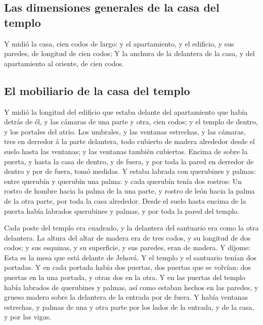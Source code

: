 \hypertarget{las-dimensiones-generales-de-la-casa-del-templo}{%
\subsection{Las dimensiones generales de la casa del
templo}\label{las-dimensiones-generales-de-la-casa-del-templo}}

 Y midió la casa, cien codos de largo: y el apartamiento, y
el edificio, y sus paredes, de longitud de cien codos;  Y
la anchura de la delantera de la casa, y del apartamiento al oriente, de
cien codos.

\hypertarget{el-mobiliario-de-la-casa-del-templo}{%
\subsection{El mobiliario de la casa del
templo}\label{el-mobiliario-de-la-casa-del-templo}}

 Y midió la longitud del edificio que estaba delante del
apartamiento que había detrás de él, y las cámaras de una parte y otra,
cien codos; y el templo de dentro, y los portales del atrio.
 Los umbrales, y las ventanas estrechas, y las cámaras,
tres en derredor á la parte delantera, todo cubierto de madera alrededor
desde el suelo hasta las ventanas; y las ventanas también cubiertas.
 Encima de sobre la puerta, y hasta la casa de dentro, y de
fuera, y por toda la pared en derredor de dentro y por de fuera, tomó
medidas.  Y estaba labrada con querubines y palmas: entre
querubín y querubín una palma: y cada querubín tenía dos rostros:
 Un rostro de hombre hacia la palma de la una parte, y
rostro de león hacia la palma de la otra parte, por toda la casa
alrededor.  Desde el suelo hasta encima de la puerta había
labrados querubines y palmas, y por toda la pared del templo.

 Cada poste del templo era cuadrado, y la delantera del
santuario era como la otra delantera.  La altura del altar
de madera era de tres codos, y su longitud de dos codos; y sus esquinas,
y su superficie, y sus paredes, eran de madera. Y díjome: Esta es la
mesa que está delante de Jehová.  Y el templo y el
santuario tenían dos portadas.  Y en cada portada había dos
puertas, dos puertas que se volvían: dos puertas en la una portada, y
otras dos en la otra.  Y en las puertas del templo había
labrados de querubines y palmas, así como estaban hechos en las paredes,
y grueso madero sobre la delantera de la entrada por de fuera.
 Y había ventanas estrechas, y palmas de una y otra parte
por los lados de la entrada, y de la casa, y por las vigas.


